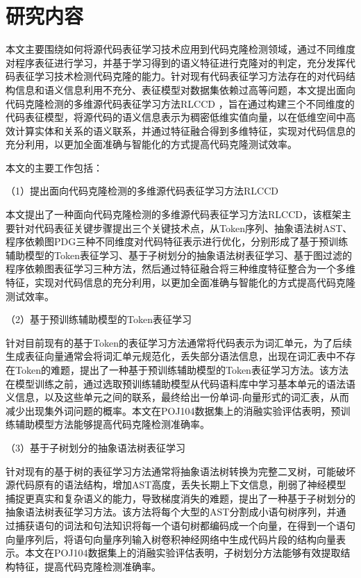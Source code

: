 \section{研究内容}
本文主要围绕如何将源代码表征学习技术应用到代码克隆检测领域，通过不同维度对程序表征进行学习，并基于学习得到的语义特征进行克隆对的判定，充分发挥代码表征学习技术检测代码克隆的能力。针对现有代码表征学习方法存在的对代码结构信息和语义信息利用不充分、表征模型对数据集依赖过高等问题，本文提出面向代码克隆检测的多维源代码表征学习方法RLCCD ，旨在通过构建三个不同维度的代码表征模型，将源代码的语义信息表示为稠密低维实值向量，以在低维空间中高效计算实体和关系的语义联系，并通过特征融合得到多维特征，实现对代码信息的充分利用，以更加全面准确与智能化的方式提高代码克隆测试效率。

本文的主要工作包括：

（1）提出面向代码克隆检测的多维源代码表征学习方法RLCCD 

本文提出了一种面向代码克隆检测的多维源代码表征学习方法RLCCD，该框架主要针对代码表征关键步骤提出三个关键技术点，从Token序列、抽象语法树AST、程序依赖图PDG三种不同维度对代码特征表示进行优化，分别形成了基于预训练辅助模型的Token表征学习、基于子树划分的抽象语法树表征学习、基于图过滤的程序依赖图表征学习三种方法，然后通过特征融合将三种维度特征整合为一个多维特征，实现对代码信息的充分利用，以更加全面准确与智能化的方式提高代码克隆测试效率。 

（2）基于预训练辅助模型的Token表征学习

针对目前现有的基于Token的表征学习方法通常将代码表示为词汇单元，为了后续生成表征向量通常会将词汇单元规范化，丢失部分语法信息，出现在词汇表中不存在Token的难题，提出了一种基于预训练辅助模型的Token表征学习方法。该方法在模型训练之前，通过选取预训练辅助模型从代码语料库中学习基本单元的语法语义信息，以及这些单元之间的联系，最终给出一份单词-向量形式的词汇表，从而减少出现集外词问题的概率。本文在POJ104数据集上的消融实验评估表明，预训练辅助模型方法能够提高代码克隆检测准确率。

（3）基于子树划分的抽象语法树表征学习

针对现有的基于树的表征学习方法通常将抽象语法树转换为完整二叉树，可能破坏源代码原有的语法结构，增加AST高度，丢失长期上下文信息，削弱了神经模型捕捉更真实和复杂语义的能力，导致梯度消失的难题，提出了一种基于子树划分的抽象语法树表征学习方法。该方法将每个大型的AST分割成小语句树序列，并通过捕获语句的词法和句法知识将每一个语句树都编码成一个向量，在得到一个语句向量序列后，将语句向量序列输入树卷积神经网络中生成代码片段的结构向量表示。本文在POJ104数据集上的消融实验评估表明，子树划分方法能够有效提取结构特征，提高代码克隆检测准确率。

